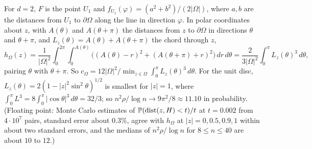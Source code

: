 \begin{remark}\label{rem:C-plane}
For $d = 2$, $F$ is the point $U_1$ and $f_{U_1}(\varphi) = (a^2 + b^2)/(2|\Omega|)$, where $a, b$ are the distances from $U_1$ to
$\partial\Omega$ along the line in direction $\varphi$. In polar coordinates about $z$, with $A(\theta)$ and $A(\theta + \pi)$ the distances
from $z$ to $\partial\Omega$ in directions $\theta$ and $\theta + \pi$, and $L_z(\theta) = A(\theta) + A(\theta + \pi)$ the chord through $z$,
\[
  h_\Omega(z) = \frac1{|\Omega|^2}\int_0^{2\pi}\!\!\int_0^{A(\theta)}\bigl((A(\theta) - r)^2 + (A(\theta + \pi) + r)^2\bigr)\,dr\,d\theta
  = \frac{2}{3|\Omega|^2}\int_0^\pi L_z(\theta)^3\,d\theta,
\]
pairing $\theta$ with $\theta + \pi$. So $c_\Omega = 12|\Omega|^2/\min_{z \in \Omega}\int_0^\pi L_z(\theta)^3\,d\theta$. For the unit disc,
$L_z(\theta) = 2(1 - |z|^2\sin^2\theta)^{1/2}$ is smallest for $|z| = 1$, where $\int_0^\pi L^3 = 8\int_0^\pi|\cos\theta|^3\,d\theta = 32/3$;
so $n^2\rho/\log n \to 9\pi^2/8 \approx 11.10$ in probability. (Floating point: Monte Carlo estimates of
$\mathbb{P}(\operatorname{dist}(z, H) < t)/t$ at $t = 0.002$ from $4\cdot10^7$ pairs, standard error about $0.3\%$, agree with $h_\Omega$ at
$|z| = 0, 0.5, 0.9, 1$ within about two standard errors, and the medians of $n^2\rho/\log n$ for $8 \le n \le 40$ are about
$10$ to $12$.)
\end{remark}
